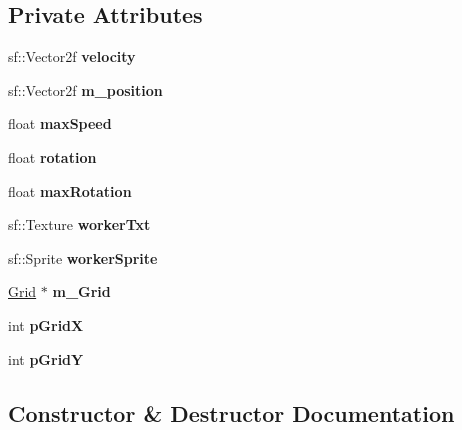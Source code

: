 \subsection*{Private Attributes}
\begin{DoxyCompactItemize}
\item 
\mbox{\label{class_worker_ac745841f864d7ac22607c10a6762f802}} 
sf\+::\+Vector2f {\bfseries velocity}
\item 
\mbox{\label{class_worker_a00add12299316bd66a2dd67c7bc1e25f}} 
sf\+::\+Vector2f {\bfseries m\+\_\+position}
\item 
\mbox{\label{class_worker_ac0bf4c1c6a84072a3f903d4a46543a3c}} 
float {\bfseries max\+Speed}
\item 
\mbox{\label{class_worker_afeee3ec85139816b299728649316da40}} 
float {\bfseries rotation}
\item 
\mbox{\label{class_worker_a9e295390f9a860295e924aa816f3a012}} 
float {\bfseries max\+Rotation}
\item 
\mbox{\label{class_worker_a4284732ef800e36ae75aa633cf9fbeef}} 
sf\+::\+Texture {\bfseries worker\+Txt}
\item 
\mbox{\label{class_worker_a5ac6c7c1089e5d30f46ef0f83c22721f}} 
sf\+::\+Sprite {\bfseries worker\+Sprite}
\item 
\mbox{\label{class_worker_a4d9e89347555f5983d73dca89c910e26}} 
\mbox{\hyperlink{class_grid}{Grid}} $\ast$ {\bfseries m\+\_\+\+Grid}
\item 
\mbox{\label{class_worker_af1c735d6441baf4004b7b2bfa9025cb4}} 
int {\bfseries p\+GridX}
\item 
\mbox{\label{class_worker_a6dd801b49806f0943867b90e5f6499ae}} 
int {\bfseries p\+GridY}
\end{DoxyCompactItemize}


\subsection{Constructor \& Destructor Documentation}
\mbox{\label{class_worker_a82c83970e5f0d42f2e81390153f9c312}} 
